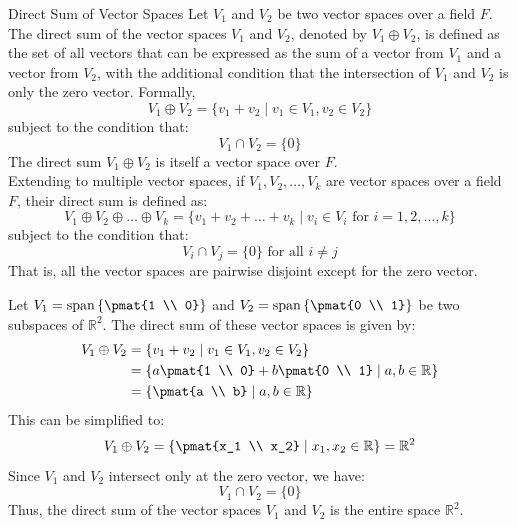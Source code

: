 \documentclass[openany]{book}
\begin{document}
\begin{mydefinition}{Direct Sum of Vector Spaces}
    Let $V_1$ and $V_2$ be two vector spaces over a field $F$. The direct sum of the vector spaces $V_1$ and $V_2$, denoted by $V_1 \oplus V_2$, is defined as the set of all vectors that can be expressed as the sum of a vector from $V_1$ and a vector from $V_2$, with the additional condition that the intersection of $V_1$ and $V_2$ is only the zero vector. Formally,
    $$V_1 \oplus V_2 = \{ v_1 + v_2 \mid v_1 \in V_1, v_2 \in V_2 \}$$
    subject to the condition that:
    $$V_1 \cap V_2 = \{0\}$$
    The direct sum $V_1 \oplus V_2$ is itself a vector space over $F$. \\
    Extending to multiple vector spaces, if $V_1, V_2, \ldots, V_k$ are vector spaces over a field $F$, their direct sum is defined as:
    $$V_1 \oplus V_2 \oplus \ldots \oplus V_k = \{ v_1 + v_2 + \ldots + v_k \mid v_i \in V_i \text{ for } i = 1, 2, \ldots, k \}$$
    subject to the condition that:
    $$V_i \cap V_j = \{0\} \text{ for all } i \neq j$$
    That is, all the vector spaces are pairwise disjoint except for the zero vector.
\end{mydefinition}
\begin{example}
    Let $V_1 = \text{span}\left\{\pmat{1 \\ 0}\right\}$ and $V_2 = \text{span}\left\{\pmat{0 \\ 1}\right\}$ be two subspaces of $\mathbb{R}^2$. The direct sum of these vector spaces is given by:
    \[
    \begin{aligned}
    V_1 \oplus V_2 &= \left\{ v_1 + v_2 \mid v_1 \in V_1, v_2 \in V_2 \right\} \\
    &= \left\{ a\pmat{1 \\ 0} + b\pmat{0 \\ 1} \mid a, b \in \mathbb{R} \right\} \\
    &= \left\{ \pmat{a \\ b} \mid a, b \in \mathbb{R} \right\}
    \end{aligned}
    \]
    This can be simplified to:
    $$V_1 \oplus V_2 = \left\{ \pmat{x_1 \\ x_2} \mid x_1, x_2 \in \mathbb{R} \right\} = \mathbb{R}^2$$
    Since $V_1$ and $V_2$ intersect only at the zero vector, we have:
    $$V_1 \cap V_2 = \{0\}$$
    Thus, the direct sum of the vector spaces $V_1$ and $V_2$ is the entire space $\mathbb{R}^2$.
\end{example}
\end{document}
